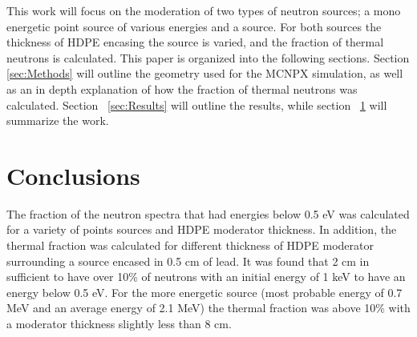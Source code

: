 \documentclass[final,onecolumn]{IEEEtran}
\begin{document}
This work will focus on the moderation of two types of neutron sources; a mono energetic point source of various energies and a  source.
For both sources the thickness of HDPE encasing the source is varied, and the fraction of thermal neutrons is calculated.
This paper is organized into the following sections.  Section \ref{sec:Methods} will outline the geometry used for the MCNPX simulation, as well as an in depth explanation of how the fraction of thermal neutrons was calculated.
Section ~\ref{sec:Results} will outline the results, while section ~\ref{sec:Conclusions} will summarize the work.




\section{Conclusions}
\label{sec:Conclusions}
The fraction of the neutron spectra that had energies below 0.5 eV was calculated for a variety of points sources and HDPE moderator thickness.
In addition, the thermal fraction was calculated for different thickness of HDPE moderator surrounding a  source encased in 0.5 cm of lead.
It was found that 2 cm in sufficient to have over 10\% of neutrons with an initial energy of 1 keV to have an energy below 0.5 eV.
For the more energetic  source (most probable energy of 0.7 MeV and an average energy of 2.1 MeV) the thermal fraction was above 10\% with a moderator thickness slightly less than 8 cm.



\newpage
\appendix

%
\end{document}
